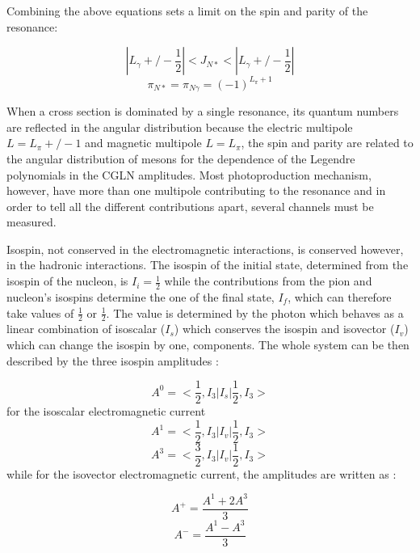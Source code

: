 \indent Combining the above equations sets a limit on the spin and parity of the resonance:

\begin{equation}
|L_{\gamma}+/-\frac{1}{2}|<J_{N*}<|L_{\gamma}+/-\frac{1}{2}|
\end{equation}
\begin{equation}
\pi_{N*}=\pi_{N\gamma}=(-1)^{L_{\pi}+1}
\end{equation}

\indent When a cross section is dominated by a single resonance, its quantum numbers are reflected in the angular distribution because the electric multipole $L={L_{\pi}+/-1}$ and magnetic multipole $L={L_{\pi}}$, the spin and parity are related to the angular distribution of mesons for the dependence of the Legendre polynomials in the CGLN amplitudes. Most photoproduction mechanism, however, have more than one multipole contributing to the resonance and in order to tell all the different contributions apart, several channels must be measured.

\indent Isospin, not conserved in the electromagnetic interactions, is conserved however, in the hadronic interactions. The isospin of the initial state, determined from the isospin of the nucleon, is $I_{i}=\frac{1}{2}$ while the contributions from the pion and nucleon's isospins determine the one of the final state, $I_{f}$, which can therefore take values of $\frac{1}{2}$ or $\frac{1}{2}$. The value is determined by the photon which behaves as a linear combination of isoscalar ($I_{s}$) which conserves the isospin and isovector ($I_{v}$) which can change the isospin by one, components. The whole system can be then described by the three isospin amplitudes \cite{nagl}:

\begin{equation}
A^{0}=<\frac{1}{2},I_{3}|I_{s}|\frac{1}{2},I_{3}>
\end{equation}
for the isoscalar electromagnetic current
\begin{equation}
A^{1}=<\frac{1}{2},I_{3}|I_{v}|\frac{1}{2},I_{3}>
\end{equation}
\begin{equation}
A^{3}=<\frac{3}{2},I_{3}|I_{v}|\frac{1}{2},I_{3}>
\end{equation}
while for the isovector electromagnetic current, the amplitudes are written as \cite{davidson}:

\begin{equation}
A^{+}=\frac{A^{1}+2A^{3}}{3}
\end{equation}
\begin{equation}
A^{-}=\frac{A^{1}-A^{3}}{3}
\end{equation}

